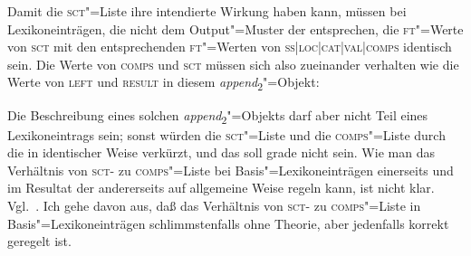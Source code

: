 \documentclass[output=paper]{LSP/langsci}
\begin{document}
\addlines[2]
\randnum\label{rn:17-36-2}Damit die \textsc{sct}"=Liste ihre intendierte Wirkung haben
kann, müssen bei Lexikoneinträgen, die nicht dem Output"=Muster der
 entsprechen, die \textsc{ft}"=Werte von \textsc{sct} mit den
entsprechenden \textsc{ft}"=Werten von \textsc{ss|loc|cat|val|comps} identisch sein. Die Werte von \textsc{comps} und
\textsc{sct} müssen sich also zueinander verhalten wie die Werte von
\textsc{left} und \textsc{result} in diesem \textit{append}\textsubscript{2}"=Objekt:
\begin{exe}
\ex
{}
\end{exe}

\randnum\label{rn:17-37}Die Beschreibung eines solchen
\textit{append}\textsubscript{2}"=Objekts darf aber nicht Teil eines
Lexikoneintrags sein; sonst würden die \textsc{sct}"=Liste und die
\textsc{comps}"=Liste durch die  in identischer Weise
verkürzt, und das soll grade nicht sein. Wie man das Verhältnis von
\textsc{sct}- zu \textsc{comps}"=Liste bei Basis"=Lexikoneinträgen
einerseits und im Resultat der  andererseits auf
allgemeine Weise regeln kann, ist nicht klar. Vgl.\ \citet[379 Anm.~38]{PollardSag1994}. Ich gehe davon aus, daß das Verhältnis von \textsc{sct}- zu \textsc{comps}"=Liste in Basis"=Lexikoneinträgen schlimmstenfalls ohne Theorie, aber
jedenfalls korrekt geregelt ist.
\end{document}
